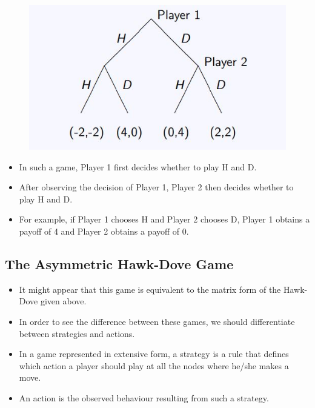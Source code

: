 \documentclass[]{report}
\begin{document}



\begin{figure}[h!]
\centering
\includegraphics[width=0.55\linewidth]{images/DR5-Slide09}
\caption{}
\label{fig:DR5-Slide09}
\end{figure}


\begin{itemize}
	\item In such a game, Player 1 first decides whether to play H and D.
	\item After observing the decision of Player 1, Player 2 then decides
	whether to play H and D.
	\item For example, if Player 1 chooses H and Player 2 chooses D, Player
	1 obtains a payoff of 4 and Player 2 obtains a payoff of 0.
\end{itemize}


\subsection{The Asymmetric Hawk-Dove Game}

\begin{itemize}
\item It might appear that this game is equivalent to the matrix form of
	the Hawk-Dove given above.
\item In order to see the difference between these games, we should
	differentiate between strategies and actions.
\item In a game represented in extensive form, a strategy is a rule that
	defines which action a player should play at all the nodes where
	he/she makes a move.
\item An action is the observed behaviour resulting from such a strategy.
\end{itemize}
\end{document}
